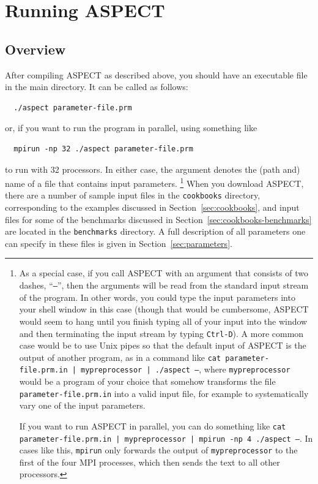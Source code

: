 \documentclass{article}
\newcommand{\aspect}{\textsc{ASPECT}}
\begin{document}

\section{Running \aspect}
\label{sec:running}

\subsection{Overview}
\label{sec:running-overview}

After compiling \aspect{} as described above, you should have an executable
file in the main directory. It can be called as follows:
\begin{verbatim}
  ./aspect parameter-file.prm
\end{verbatim}
or, if you want to run the program in parallel, using something like
\begin{verbatim}
  mpirun -np 32 ./aspect parameter-file.prm
\end{verbatim}
to run with 32 processors. In either case, the argument denotes the (path and)
name of a file that contains input parameters.%
\footnote{As a special case, if you call \aspect{} with an argument that
consists of two dashes, ``\texttt{--}'', then the arguments will be read from
the standard input stream of the program. In other words, you could type the
input parameters into your shell window in this case (though that would be
cumbersome, \aspect{} would seem to hang until you finish typing all of your
input into the window and then terminating the input stream by typing
\texttt{Ctrl-D}). A more common case would be to use Unix pipes so that the
default 
input of \aspect{} is the output of another program, as in a command like
\texttt{cat parameter-file.prm.in | mypreprocessor | ./aspect --}, where
\texttt{mypreprocessor} would be a program of your choice that somehow
transforms the file \texttt{parameter-file.prm.in} into a valid input file,
for example to systematically vary one of the input parameters.

If you want to run \aspect{} in parallel, you can do something like
\texttt{cat parameter-file.prm.in | mypreprocessor | mpirun -np 4 ./aspect
  --}. In cases like this, \texttt{mpirun} only forwards the output of
\texttt{mypreprocessor} to the first of the four MPI processes, which then
sends the text to all other processors.}
When you download \aspect{}, there are a number of sample input files in the
\texttt{cookbooks} directory, corresponding to the examples discussed in
Section~\ref{sec:cookbooks}, and input files for some of the benchmarks discussed
in Section~\ref{sec:cookbooks-benchmarks} are located in the \texttt{benchmarks}
directory. A full description of all parameters one can specify in these files
is given in Section~\ref{sec:parameters}.
\end{document}
